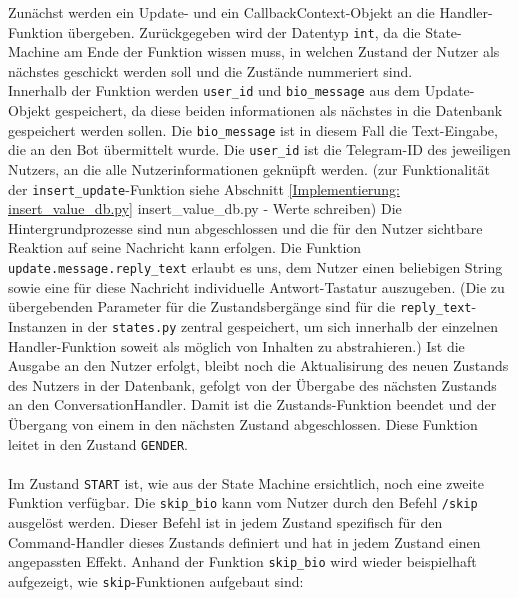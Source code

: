             Zunächst werden ein Update- und ein CallbackContext-Objekt an die Handler-Funktion übergeben. Zurückgegeben wird der Datentyp \verb|int|, da die State-Machine am Ende der Funktion wissen muss, in welchen Zustand der Nutzer als nächstes geschickt werden soll und die Zustände nummeriert sind. \\
            Innerhalb der Funktion werden \verb|user_id| und \verb|bio_message| aus dem Update-Objekt gespeichert, da diese beiden informationen als nächstes in die Datenbank gespeichert werden sollen. Die \verb|bio_message| ist in diesem Fall die Text-Eingabe, die an den Bot übermittelt wurde. Die \verb|user_id| ist die Telegram-ID des jeweiligen Nutzers, an die alle Nutzerinformationen geknüpft werden.
            (zur Funktionalität der \verb|insert_update|-Funktion siehe Abschnitt \ref{Implementierung: insert_value_db.py} insert\_value\_db.py - Werte schreiben)
            Die Hintergrundprozesse sind nun abgeschlossen und die für den Nutzer sichtbare Reaktion auf seine Nachricht kann erfolgen. Die Funktion \verb|update.message.reply_text| erlaubt es uns, dem Nutzer einen beliebigen String sowie eine für diese Nachricht individuelle Antwort-Tastatur auszugeben. (Die zu übergebenden Parameter für die Zustandsbergänge sind für die \verb|reply_text|-Instanzen in der \verb|states.py| zentral gespeichert, um sich innerhalb der einzelnen Handler-Funktion soweit als möglich von Inhalten zu abstrahieren.)
            Ist die Ausgabe an den Nutzer erfolgt, bleibt noch die Aktualisirung des neuen Zustands des Nutzers in der Datenbank, gefolgt von der Übergabe des nächsten Zustands an den ConversationHandler. Damit ist die Zustands-Funktion beendet und der Übergang von einem in den nächsten Zustand abgeschlossen. Diese Funktion leitet in den Zustand \verb|GENDER|.\\ \\

                Im Zustand \verb|START| ist, wie aus der State Machine ersichtlich, noch eine zweite Funktion verfügbar. Die \verb|skip_bio| kann vom Nutzer durch den Befehl \verb|/skip| ausgelöst werden. Dieser Befehl ist in jedem Zustand spezifisch für den Command-Handler dieses Zustands definiert und hat in jedem Zustand einen angepassten Effekt. Anhand der Funktion \verb|skip_bio| wird wieder beispielhaft aufgezeigt, wie \verb|skip|-Funktionen aufgebaut sind:

